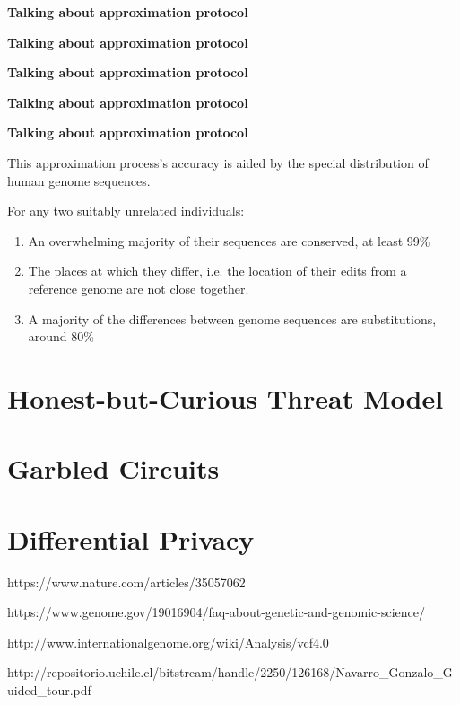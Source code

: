 \documentclass[12pt]{article}
\begin{document}
\textbf{{Talking about approximation protocol}}

\textbf{{Talking about approximation protocol}}

\textbf{{Talking about approximation protocol}}

\textbf{{Talking about approximation protocol}}

\textbf{{Talking about approximation protocol}}

This approximation process's accuracy is aided by the special distribution of human genome sequences.

For any two suitably unrelated individuals:

\begin{enumerate}
\item An overwhelming majority of their sequences are conserved, at least 99\%
\item The places at which they differ, i.e. the location of their edits from a reference genome are not close together.
\item A majority of the differences between genome sequences are substitutions, around 80\%
\end{enumerate}

\section{Honest-but-Curious Threat Model}

\section{Garbled Circuits}

\section{Differential Privacy}


\begin{thebibliography}{9}
  https://www.nature.com/articles/35057062

  https://www.genome.gov/19016904/faq-about-genetic-and-genomic-science/

  http://www.internationalgenome.org/wiki/Analysis/vcf4.0
  
  http://repositorio.uchile.cl/bitstream/handle/2250/126168/Navarro\_Gonzalo\_Guided\_tour.pdf

\end{thebibliography}
\end{document}
